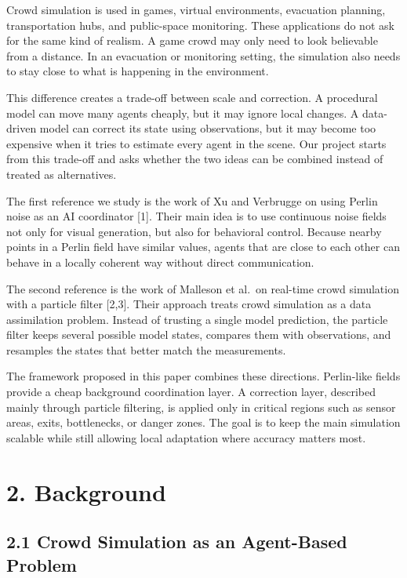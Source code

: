 \documentclass[
  11pt,
]{article}
\begin{document}
Crowd simulation is used in games, virtual environments, evacuation
planning, transportation hubs, and public-space monitoring. These
applications do not ask for the same kind of realism. A game crowd may
only need to look believable from a distance. In an evacuation or
monitoring setting, the simulation also needs to stay close to what is
happening in the environment.

This difference creates a trade-off between scale and correction. A
procedural model can move many agents cheaply, but it may ignore local
changes. A data-driven model can correct its state using observations,
but it may become too expensive when it tries to estimate every agent in
the scene. Our project starts from this trade-off and asks whether the
two ideas can be combined instead of treated as alternatives.

The first reference we study is the work of Xu and Verbrugge on using
Perlin noise as an AI coordinator {[}1{]}. Their main idea is to use
continuous noise fields not only for visual generation, but also for
behavioral control. Because nearby points in a Perlin field have similar
values, agents that are close to each other can behave in a locally
coherent way without direct communication.

The second reference is the work of Malleson et al.~on real-time crowd
simulation with a particle filter {[}2,3{]}. Their approach treats crowd
simulation as a data assimilation problem. Instead of trusting a single
model prediction, the particle filter keeps several possible model
states, compares them with observations, and resamples the states that
better match the measurements.

The framework proposed in this paper combines these directions.
Perlin-like fields provide a cheap background coordination layer. A
correction layer, described mainly through particle filtering, is
applied only in critical regions such as sensor areas, exits,
bottlenecks, or danger zones. The goal is to keep the main simulation
scalable while still allowing local adaptation where accuracy matters
most.

\section{2. Background}\label{background}

\subsection{2.1 Crowd Simulation as an Agent-Based
Problem}\label{crowd-simulation-as-an-agent-based-problem}
\end{document}
